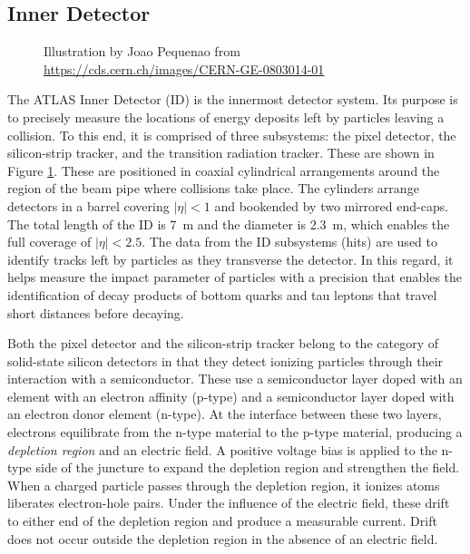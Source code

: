 \subsection{Inner Detector}

\begin{figure}[h!]
\captionsetup[subfigure]{position=b}
\centering
{}
\caption{Illustration by Joao Pequenao from \url{https://cds.cern.ch/images/CERN-GE-0803014-01}}
\label{fig:atlasId}
\end{figure}

The ATLAS Inner Detector (ID) is the innermost detector system.
Its purpose is to precisely measure the locations of energy deposits left by particles leaving a collision.
To this end, it is comprised of three subsystems: the pixel detector, the silicon-strip tracker, and the transition radiation tracker.
These are shown in Figure \ref{fig:atlasId}.
These are positioned in coaxial cylindrical arrangements around the region of the beam pipe where collisions take place.
The cylinders arrange detectors in a barrel covering $|\eta|<1$ and bookended by two mirrored end-caps.
The total length of the ID is 7~m and the diameter is 2.3~m, which enables the full coverage of $|\eta|<2.5$.
The data from the ID subsystems (hits) are used to identify tracks left by particles as they transverse the detector.
In this regard, it helps measure the impact parameter of particles with a precision that enables the identification of decay products of bottom quarks and tau leptons that travel short distances before decaying.
\cite{pixel}

Both the pixel detector and the silicon-strip tracker belong to the category of solid-state silicon detectors in that they detect ionizing particles through their interaction with a semiconductor.
These use a semiconductor layer doped with an element with an electron affinity (p-type) and a semiconductor layer doped with an electron donor element (n-type).
At the interface between these two layers, electrons equilibrate from the n-type material to the p-type material, producing a \emph{depletion region} and an electric field.
A positive voltage bias is applied to the n-type side of the juncture to expand the depletion region and strengthen the field.
When a charged particle passes through the depletion region, it ionizes atoms liberates electron-hole pairs.
Under the influence of the electric field, these drift to either end of the depletion region and produce a measurable current.
Drift does not occur outside the depletion region in the absence of an electric field. \cite{grupen}

